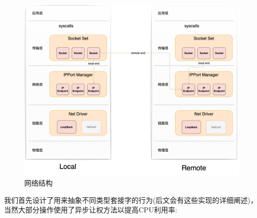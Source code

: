 \documentclass{article}
\begin{document}
\begin{figure}[H]
    \centering
    \includegraphics[width=1\linewidth]{assets/net/struct.png}
    \caption{网络结构}
    \label{网络结构}
\end{figure}

我们首先设计了用来抽象不同类型套接字的行为(后文会有这些实现的详细阐述)，当然大部分操作使用了异步让权方法以提高CPU利用率:
\end{document}
